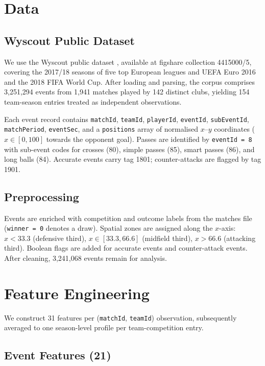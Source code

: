 \documentclass[runningheads]{llncs}
\begin{document}
\section{Data}

\subsection{Wyscout Public Dataset}

We use the Wyscout public dataset \cite{pappalardo2019}, available at figshare collection 4415000/5, covering the 2017/18 seasons of five top European leagues and UEFA Euro 2016 and the 2018 FIFA World Cup. After loading and parsing, the corpus comprises 3,251,294 events from 1,941 matches played by 142 distinct clubs, yielding 154 team-season entries treated as independent observations.

Each event record contains \texttt{matchId}, \texttt{teamId}, \texttt{playerId}, \texttt{eventId}, \texttt{subEventId}, \texttt{matchPeriod}, \texttt{eventSec}, and a \texttt{positions} array of normalised $x$--$y$ coordinates ($x \in [0, 100]$ towards the opponent goal). Passes are identified by \texttt{eventId = 8} with sub-event codes for crosses (80), simple passes (85), smart passes (86), and long balls (84). Accurate events carry tag 1801; counter-attacks are flagged by tag 1901.

\subsection{Preprocessing}

Events are enriched with competition and outcome labels from the matches file (\texttt{winner = 0} denotes a draw). Spatial zones are assigned along the $x$-axis: $x < 33.3$ (defensive third), $x \in [33.3, 66.6]$ (midfield third), $x > 66.6$ (attacking third). Boolean flags are added for accurate events and counter-attack events. After cleaning, 3,241,068 events remain for analysis.

\section{Feature Engineering}

We construct 31 features per (\texttt{matchId}, \texttt{teamId}) observation, subsequently averaged to one season-level profile per team-competition entry.

\subsection{Event Features (21)}
\end{document}
